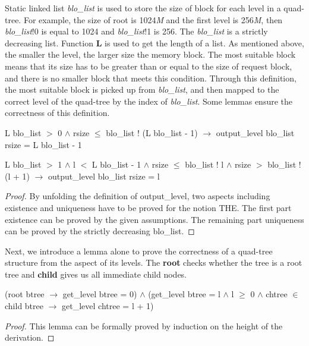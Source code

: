 \documentclass[runningheads]{llncs}
\begin{document}
Static linked list \emph{blo\_list} is used to store the size of block for each level in a quad-tree. For example, the size of root is 1024\emph{M} and the first level is 256\emph{M}, then \emph{blo\_list}!0 is equal to 1024 and \emph{blo\_list}!1 is 256. The \emph{blo\_list} is a strictly decreasing list. Function \textbf{L} is used to get the length of a list. As mentioned above, the smaller the level, the larger size the memory block. The most suitable block means that its size has to be greater than or equal to the size of request block, and there is no smaller block that meets this condition. Through this definition, the most suitable block is picked up from \emph{blo\_list}, and then mapped to the correct level of the quad-tree by the index of \emph{blo\_list}. Some lemmas ensure the correctness of this definition.

\begin{lemma}
L blo\_list $>$ 0 $\wedge$ rsize $\leq$ blo\_list ! (L blo\_list - 1) $\longrightarrow$ output\_level blo\_list rsize = L blo\_list - 1
\end{lemma}

\begin{lemma}
L blo\_list $>$ 1 $\wedge$ l $<$ L blo\_list - 1 $\wedge$ rsize $\leq$ blo\_list ! l $\wedge$ rsize $>$ blo\_list ! (l + 1) $\longrightarrow$ output\_level blo\_list rsize = l
\end{lemma}

\begin{proof}
By unfolding the definition of output\_level, two aspects including existence and uniqueness have to be proved for the notion THE. The first part existence can be proved by the given assumptions. The remaining part uniqueness can be proved by the strictly decreasing blo\_list.
\end{proof}

Next, we introduce a lemma alone to prove the correctness of a quad-tree structure from the aspect of its levels. The \textbf{root} checks whether the tree is a root tree and \textbf{child} gives us all immediate child nodes.

\begin{lemma}
(root btree $\longrightarrow$ get\_level btree = 0) $\wedge$ (get\_level btree = l $\wedge$ l $\geq$ 0 $\wedge$ chtree $\in$ child btree $\longrightarrow$ get\_level chtree = l + 1)
\end{lemma}

\begin{proof}
This lemma can be formally proved by induction on the height of the derivation.
\end{proof}
\end{document}
